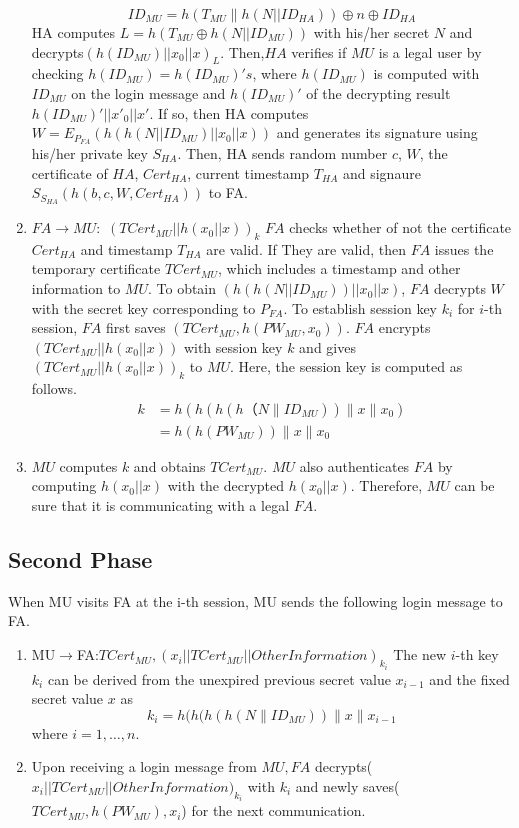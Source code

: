 \documentclass[UTF8]{ctexart}
\begin{document}
\begin{enumerate}
    \begin{equation}
    ID_{MU}=h(T_{MU}\|h(N||ID_{HA}))\oplus n\oplus ID_{HA}
    \end{equation}
    HA computes $L = h(T_{MU}\oplus h(N||ID_{MU}))$ with his/her secret $N$ and decrypts$(h(ID_{MU})||x_{0}||x)_{L}$. Then,$HA$ verifies if $MU$ is a legal user by checking $h(ID_{MU})=h(ID_{MU})'s$, where $h(ID_{MU})$ is computed with $ID_{MU}$ on the login message and $h(ID_{MU})'$ of the decrypting result ${h(ID_{MU})'||x'_{0}||x'}$. If so, then HA computes $W = E_{P_{FA}}(h(h(N||ID_{MU})||x_{0}||x))$ and generates its signature using his/her private key $S_{HA}$. Then, HA sends random number $c$, $W$, the certificate of $HA$, $Cert_{HA}$, current timestamp $T_{HA}$ and signaure $S_{S_{HA}}(h(b,c,W,Cert_{HA}))$ to FA.
  \item $FA\rightarrow MU:$ $(TCert_{MU}||h(x_{0}||x))_{k}$ $FA$ checks whether of not the certificate $Cert_{HA}$ and timestamp $T_{HA}$ are valid. If They are valid, then $FA$ issues the temporary certificate $TCert_{MU}$, which includes a timestamp and other information to $MU$. To obtain $(h(h(N||ID_{MU}))||x_{0}||x)$, $FA$ decrypts $W$ with the secret key corresponding to $P_{FA}$. To establish session key $k_{i}$ for $i$-th session, $FA$ first saves $(TCert_{MU},h(PW_{MU},x_{0}))$. $FA$ encrypts $(TCert_{MU}||h(x_{0}||x))$ with session key $k$ and gives $(TCert_{MU}||h(x_{0}||x))_{k}$ to $MU$. Here, the session key is computed as follows.
      \begin{equation}
    \begin{aligned}
    k&=h(h(h(h（N\|ID_{MU}))\|x\|x_0)\\
    &=h(h(PW_{MU}))\|x\|x_0
    \end{aligned}
    \end{equation}
  \item $MU$ computes $k$ and obtains $TCert_{MU}$. $MU$ also authenticates $FA$ by computing $h(x_{0}||x)$ with the decrypted $h(x_{0}||x)$. Therefore, $MU$ can be sure that it is communicating with a legal $FA$.
\end{enumerate}




\subsection{Second Phase}
When MU visits FA at the i-th session, MU sends the following login message to FA.
\begin{enumerate}
\item
MU$\rightarrow$FA:$TCert_{MU},(x_{i}||TCert_{MU}||Other Information)_{k_{i}}$ The new $i$-th key $k_{i}$ can be derived from the unexpired previous secret value $x_{i-1}$ and the fixed secret value $x$ as
\begin{equation}
k_i=h(h(h(h(N\|ID_{MU}))\|x\|x_{i-1}
\end{equation}
where $i= 1,\ldots,n.$
\item
Upon receiving a login message from $MU, FA$ decrypts($x_{i}||TCert_{MU}||OtherInformation)_{k_{i}}$ with $k_{i}$ and newly saves($TCert_{MU},h(PW_{MU}),x_{i}$) for the next communication.
\end{enumerate}
\end{document}
